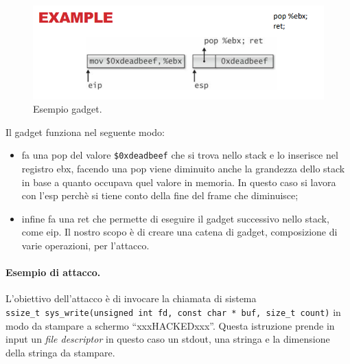 \begin{figure}[H]
	\centering
    \includegraphics[width=13cm, keepaspectratio]{santini/img/cap_3/es_gadget.png}
	\caption{Esempio gadget.}\label{fig:es_gadget}
\end{figure}

Il gadget funziona nel seguente modo:
\begin{itemize}
    \item fa una pop del valore \verb|$0xdeadbeef| che si trova nello stack e lo inserisce nel registro ebx, facendo una pop viene diminuito anche la grandezza dello stack in base a quanto occupava quel valore in memoria. In questo caso si lavora con l'esp perchè si tiene conto della fine del frame che diminuisce;
    \item infine fa una ret che permette di eseguire il gadget successivo nello stack, come eip. Il nostro scopo è di creare una catena di gadget, composizione di varie operazioni, per l'attacco.
\end{itemize}

\paragraph{Esempio di attacco.}
L'obiettivo dell'attacco è di invocare la chiamata di sistema \\
\verb|ssize_t sys_write(unsigned int fd, const char * buf, size_t count)|
in modo da stampare a schermo “xxxHACKEDxxx”. Questa istruzione prende in input un \textit{file descriptor} in questo caso un stdout, una stringa e la dimensione della stringa da stampare.


